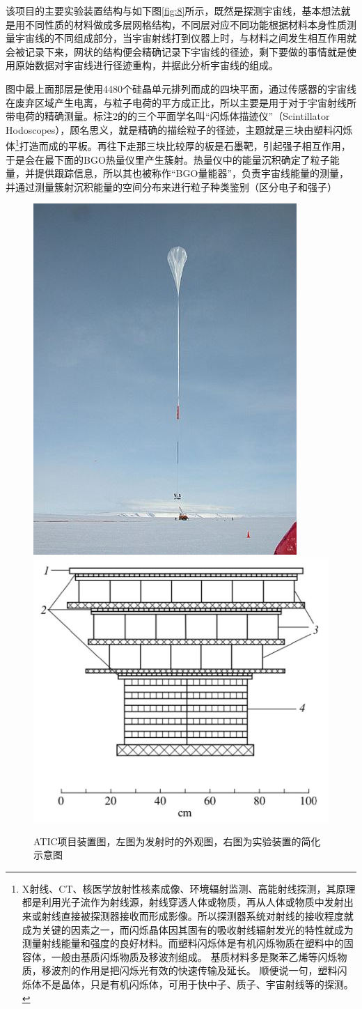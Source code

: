 \documentclass{ctexart}
\begin{document}
	该项目的主要实验装置结构与如下图\ref{fig:8}所示，既然是探测宇宙线，基本想法就是用不同性质的材料做成多层网格结构，不同层对应不同功能根据材料本身性质测量宇宙线的不同组成部分，当宇宙射线打到仪器上时，与材料之间发生相互作用就会被记录下来，网状的结构便会精确记录下宇宙线的径迹，剩下要做的事情就是使用原始数据对宇宙线进行径迹重构，并据此分析宇宙线的组成。
	
	图中最上面那层是使用4480个硅晶单元排列而成的四块平面，通过传感器的宇宙线在废弃区域产生电离，与粒子电荷的平方成正比，所以主要是用于对于宇宙射线所带电荷的精确测量。标注2的的三个平面学名叫“闪烁体描迹仪”（Scintillator Hodoscopes），顾名思义，就是精确的描绘粒子的径迹，主题就是三块由塑料闪烁体\footnote{X射线、CT、核医学放射性核素成像、环境辐射监测、高能射线探测，其原理都是利用光子流作为射线源，射线穿透人体或物质，再从人体或物质中发射出来或射线直接被探测器接收而形成影像。所以探测器系统对射线的接收程度就成为关键的因素之一，而闪烁晶体因其固有的吸收射线辐射发光的特性就成为测量射线能量和强度的良好材料。而塑料闪烁体是有机闪烁物质在塑料中的固容体，一般由基质闪烁物质及移波剂组成。 基质材料多是聚苯乙烯等闪烁物质，移波剂的作用是把闪烁光有效的快速传输及延长。 顺便说一句，塑料闪烁体不是晶体，只是有机闪烁体，可用于快中子、质子、宇宙射线等的探测。}打造而成的平板。再往下走那三块比较厚的板是石墨靶，引起强子相互作用，于是会在最下面的BGO热量仪里产生簇射。热量仪中的能量沉积确定了粒子能量，并提供跟踪信息，所以其也被称作“BGO量能器”，负责宇宙线能量的测量，并通过测量簇射沉积能量的空间分布来进行粒子种类鉴别（区分电子和强子）
	
	\begin{figure}[h]
		\centering
		\includegraphics[width=.33\linewidth]{figs/fig9-1.jpg}
		\hspace{.05\linewidth}
		\includegraphics[width=.5\linewidth]{figs/fig9-2.jpg}
		\label{fig:9}
		\caption{ATIC项目装置图，左图为发射时的外观图，右图为实验装置的简化示意图}
	\end{figure}
	
\end{document}
